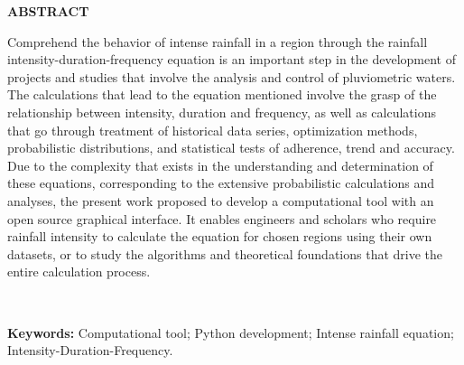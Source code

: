 \thispagestyle{empty}

\singlespacing
\begin{center}
	\textbf{ABSTRACT}
\end{center}

\noindent 

Comprehend the behavior of intense rainfall in a region through the rainfall intensity-duration-frequency equation is an important step in the development of projects and studies that involve the analysis and control of pluviometric waters. The calculations that lead to the equation mentioned involve the grasp of the relationship between intensity, duration and frequency, as well as calculations that go through treatment of historical data series, optimization methods, probabilistic distributions, and statistical tests of adherence, trend and accuracy. Due to the complexity that exists in the understanding and determination of these equations, corresponding to the extensive probabilistic calculations and analyses, the present work proposed to develop a computational tool with an open source graphical interface. It enables engineers and scholars who require rainfall intensity to calculate the equation for chosen regions using their own datasets, or to study the algorithms and theoretical foundations that drive the entire calculation process.

\ \

\noindent \textbf{Keywords:} Computational tool; Python development; Intense rainfall equation; Intensity-Duration-Frequency.
\newpage